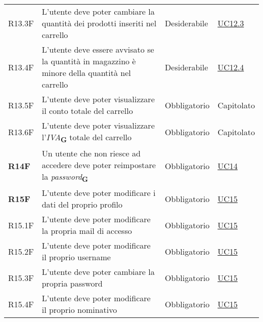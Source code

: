 \begin{center}
\begin{longtable}[!h]{p{50px} p{245px} p{75px} p{50px}}
        R13.3F                                & L'utente deve poter cambiare la quantità dei prodotti inseriti nel carrello                                & Desiderabile             & \hyperref[sec:UC12.3]{UC12.3}                \\
        R13.4F                                & L'utente deve essere avvisato se la quantità in magazzino è minore della quantità nel carrello             & Desiderabile             & \hyperref[sec:UC12.4]{UC12.4}                \\
        R13.5F                                & L'utente deve poter visualizzare il conto totale del carrello                                              & Obbligatorio             & Capitolato                                   \\
        R13.6F                                & L'utente deve poter visualizzare l'\textit{IVA}\textsubscript{\textbf{G}} totale del carrello              & Obbligatorio             & Capitolato                                   \\
        \textbf{R14F}                         & Un utente che non riesce ad accedere deve poter reimpostare la \textit{password}\textsubscript{\textbf{G}} & Obbligatorio             & \hyperref[sec:UC14]{UC14}                    \\
        \textbf{R15F}                         & L'utente deve poter modificare i dati del proprio profilo                                                    & Obbligatorio             & \hyperref[sec:UC15]{UC15}                    \\
        R15.1F                                & L'utente deve poter modificare la propria mail di accesso                                                  & Obbligatorio             & \hyperref[sec:UC15]{UC15}                    \\
        R15.2F                                & L'utente deve poter modificare il proprio username                                                         & Obbligatorio             & \hyperref[sec:UC15]{UC15}                    \\
        R15.3F                                & L'utente deve poter cambiare la propria password                                                           & Obbligatorio             & \hyperref[sec:UC15]{UC15}                    \\
        R15.4F                                & L'utente deve poter modificare il proprio nominativo                                                       & Obbligatorio             & \hyperref[sec:UC15]{UC15}                    \\

\end{longtable}
\end{center}
